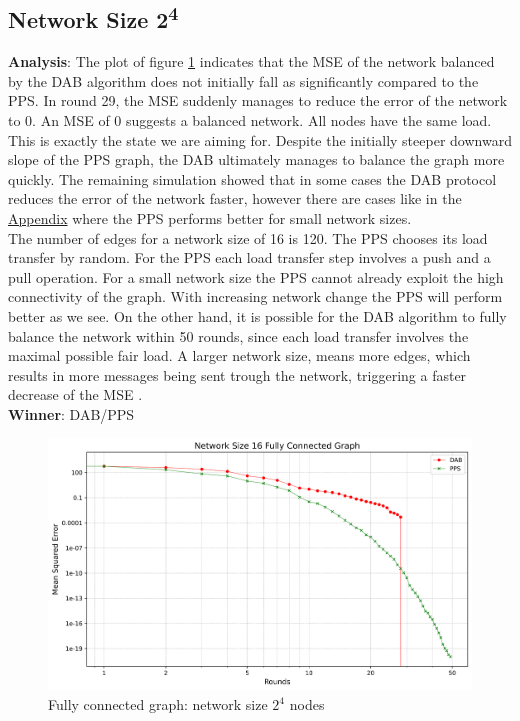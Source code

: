 \subsection{Network Size 2\textsuperscript{4}}
\textbf{Analysis}: The plot of figure \ref{fig:16CompleteGraph} indicates that the MSE of the network balanced by the DAB algorithm does not initially fall as significantly compared to the PPS. In round 29, the MSE suddenly manages to reduce the error of the network to 0. An MSE of 0 suggests a balanced network. All nodes have the same load. This is exactly the state we are aiming for. Despite the initially steeper downward slope of the PPS graph, the DAB ultimately manages to balance the graph more quickly. The remaining simulation showed that in some cases the DAB protocol reduces the error of the network faster, however there are cases like in the \hyperref[chap:appendix]{Appendix} where the PPS performs better for small network sizes. \\
The number of edges for a network size of 16 is 120. The PPS chooses its load transfer by random. For the PPS each load transfer step involves a push and a pull operation. For a small network size the PPS cannot already exploit the high connectivity of the graph. With increasing network change the PPS will perform better as we see. On the other hand, it is possible for the DAB algorithm to fully balance the network within 50 rounds, since each load transfer involves the maximal possible fair load. A larger network size, means more edges, which results in more messages being sent trough the network, triggering a faster decrease of the MSE \cite{nugroho2023PushPullSumDataAg}. \\
\textbf{Winner}: DAB/PPS\\
\begin{figure}[H]
    \centering
    \includegraphics[scale=0.5]{figures/completeGraphSimulations/DAB_vs_PPS_FCG_r50_n16.png}
    \caption{Fully connected graph: network size $2^{4}$ nodes}
    \label{fig:16CompleteGraph}
\end{figure}

